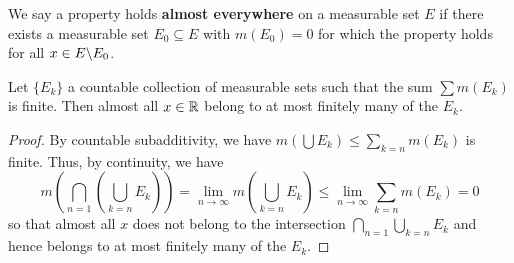 \begin{definition}
    We say a property holds \textbf{almost everywhere} on a measurable set $E$
    if there exists a measurable set $E_0 \subseteq E$ with $m(E_0)=0$ for which
    the property holds for all $x \in E\backslash E_0$.
\end{definition}

\begin{lemma}\label{2.4.4}
    Let $\{E_k\}$ a countable collection of measurable sets such that the sum
    $\sum{m(E_k)}$ is finite. Then almost all $x \in \mathbb{R}$ belong to at most
    finitely many of the  $E_k$.
\end{lemma}
\begin{proof}
    By countable subadditivity, we have $m(\bigcup{E_k}) \leq
    \sum_{k=n}{m(E_k)}$ is finite. Thus, by continuity, we have
    \begin{equation*}
        m(\bigcap_{n=1}{(\bigcup_{k=n}{E_k})})=
        \lim_{n \xrightarrow{} \infty}{m(\bigcup_{k=n}{E_k})} \leq
        \lim_{n \xrightarrow{} \infty}{\sum_{k=n}{m(E_k)}}=0
    \end{equation*}
    so that almost all $x$ does not belong to the intersection
    $\bigcap_{n=1}{\bigcup_{k=n}{E_k}}$ and hence belongs to at most finitely
    many of the $E_k$.
\end{proof}
